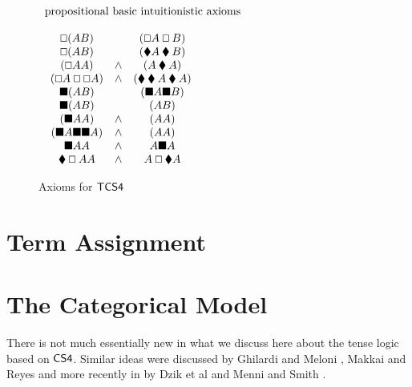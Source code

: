 \documentclass{article}
\let\Diamond\relax
\newcommand{\bLozenge}{\mathbin{\blacklozenge}}
\let\to\relax
\newcommand{\to}{\rightarrow}
\renewcommand{\Box}{\oblong}
\begin{document}
\begin{figure}
  \begin{mdframed}
  \begin{center}
    \begin{math}
      \begin{array}{lll}
        \mbox{propositional basic intuitionistic  axioms}\\\\
        \begin{array}{ccc}          
          \Box (A \to B) &\to &(\Box A \to \Box B)\\
          \Box (A \to B) &\to &(\bLozenge A\to \bLozenge B)\\
          (\Box A\to A) &\land &(A\to \bLozenge A)\\
          (\Box A\to \Box\Box A) &\land &(\bLozenge \bLozenge A \to \bLozenge A)\\
          \blacksquare (A \to B) &\to &(\blacksquare A \to \blacksquare B)\\
          \blacksquare (A \to B) &\to &(\Diamond A\to \Diamond B)\\
          (\blacksquare A\to A) &\land &(A\to \Diamond A)\\
          (\blacksquare A\to \blacksquare\blacksquare A) &\land &(\Diamond \Diamond A \to \Diamond A)\\
          \Diamond \blacksquare A\to A &\land &A\to \blacksquare\Diamond A\\
          \bLozenge\Box A\to A &\land &A\to \Box \bLozenge A\\
        \end{array}
      \end{array}
      \end{math}
  \end{center}
 \end{mdframed}
  \caption{Axioms for $\sf{TCS4}$}
  \label{axiomCS4}
\end{figure}

\section{Term Assignment}
\label{sec:term_assignment}





\section{The Categorical Model}
There is not much essentially new in what we discuss here about the
tense logic based on $\sf{CS4}$. Similar ideas were discussed by
Ghilardi and Meloni \cite{ghilardi1988}, Makkai and Reyes
\cite{makkai1995} and more recently in by Dzik et al
\cite{dziketal2012} and Menni and Smith \cite{Menni:2014}.
\end{document}
